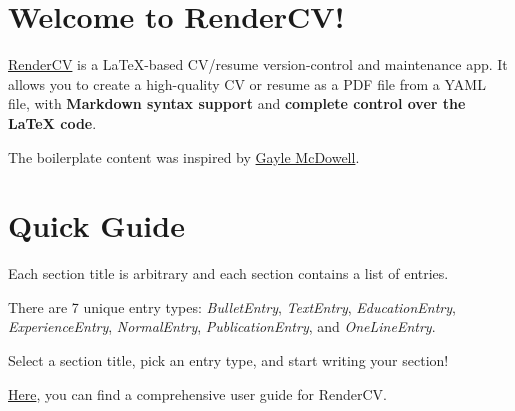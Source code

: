 



	\newcommand{\AND}{\unskip
		\cleaders\copy\ANDbox\hskip\wd\ANDbox
		\ignorespaces
	}
	\newsavebox\ANDbox
	\sbox\ANDbox{$|$}
	
	
	
	
	\section{Welcome to RenderCV!}
	
	
	\begin{onecolentry}
		\href{https://rendercv.com}{RenderCV} is a LaTeX-based CV/resume version-control and maintenance app. It allows you to create a high-quality CV or resume as a PDF file from a YAML file, with \textbf{Markdown syntax support} and \textbf{complete control over the LaTeX code}.
	\end{onecolentry}
	
	\vspace{0.2 cm}
	
	\begin{onecolentry}
		The boilerplate content was inspired by \href{https://github.com/dnl-blkv/mcdowell-cv}{Gayle McDowell}.
	\end{onecolentry}
	
	
	
	\section{Quick Guide}
	
	\begin{onecolentry}
		\begin{highlightsforbulletentries}
			
			
			\item Each section title is arbitrary and each section contains a list of entries.
			
			\item There are 7 unique entry types: \textit{BulletEntry}, \textit{TextEntry}, \textit{EducationEntry}, \textit{ExperienceEntry}, \textit{NormalEntry}, \textit{PublicationEntry}, and \textit{OneLineEntry}.
			
			\item Select a section title, pick an entry type, and start writing your section!
			
			\item \href{https://docs.rendercv.com/user_guide/}{Here}, you can find a comprehensive user guide for RenderCV.
			
			
		\end{highlightsforbulletentries}
	\end{onecolentry}
	

